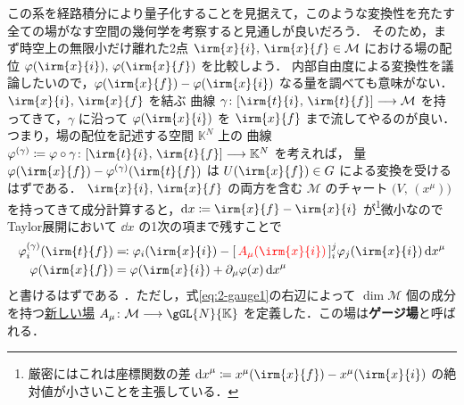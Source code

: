 \documentclass[TQFT_main]{subfiles}
\begin{document}
この系を経路積分により量子化することを見据えて，このような変換性を充たす全ての場がなす空間の幾何学を考察すると見通しが良いだろう．
そのため，まず時空上の無限小だけ離れた2点 $\irm{x}{i},\, \irm{x}{f} \in \mathcal{M}$ における場の配位 $\varphi(\irm{x}{i}),\, \varphi(\irm{x}{f})$ を比較しよう．
内部自由度による変換性を議論したいので，$\varphi (\irm{x}{f}) - \varphi(\irm{x}{i})$ なる量を調べても意味がない．$\irm{x}{i},\, \irm{x}{f}$ を結ぶ \cinfty 曲線 $\gamma \colon [\irm{t}{i},\, \irm{t}{f}] \lto \mathcal{M}$ を持ってきて，$\gamma$ に沿って $\varphi(\irm{x}{i})$ を $\irm{x}{f}$ まで流してやるのが良い．つまり，場の配位を記述する空間 $\mathbb{K}^N$ 上の \cinfty 曲線 $\varphi^{(\gamma)} \coloneqq \varphi \circ \gamma \colon [\irm{t}{i},\, \irm{t}{f}] \lto \mathbb{K}^N$ を考えれば，
量 $\varphi (\irm{x}{f}) - \varphi^{(\gamma)}(\irm{t}{f})$ は $U(\irm{x}{f}) \in G$ による変換を受けるはずである．
$\irm{x}{i},\, \irm{x}{f}$ の両方を含む $\mathcal{M}$ のチャート $\bigl( V,\, (x^\mu) \bigr)$ を持ってきて成分計算すると，$\dd{x} \coloneqq \irm{x}{f} - \irm{x}{i}$ が\footnote{厳密にはこれは座標関数の差 $\dd{x}^\mu \coloneqq x^\mu(\irm{x}{f}) - x^\mu(\irm{x}{i})$ の絶対値が小さいことを主張している．}微小なのでTaylor展開において $\dd{x}$ の1次の項まで残すことで
\begin{align}
    \varphi^{(\gamma)}_i(\irm{t}{f}) &\eqqcolon \varphi_i (\irm{x}{i}) - [\, \textcolor{red}{A_\mu(\irm{x}{i})} \,]^j_i \varphi_j (\irm{x}{i}) \dd{x}^\mu \label{eq:2-gauge1} \\
    \varphi(\irm{x}{f}) &= \varphi (\irm{x}{i}) + \partial_\mu \varphi (x) \dd{x}^\mu
\end{align}
と書けるはずである
．ただし，式\eqref{eq:2-gauge1}の右辺によって $\dim \mathcal{M}$ 個の成分を持つ\underline{新しい場} $A_\mu \colon \mathcal{M} \lto \gGL{N}{\mathbb{K}}$ を定義した．この場は\textbf{ゲージ場}と呼ばれる．
\end{document}
